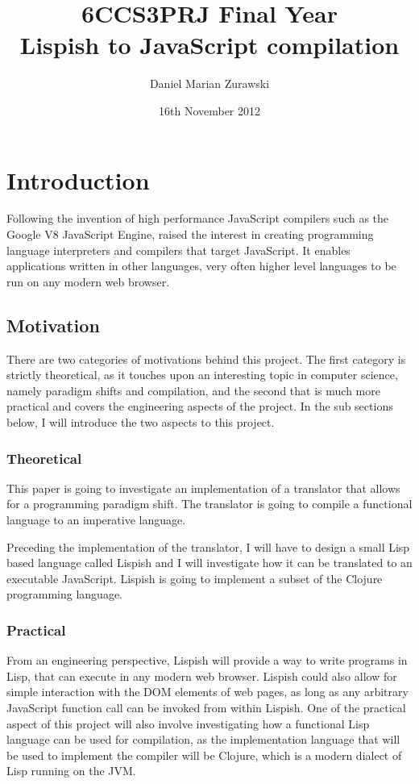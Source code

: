 \documentclass[11pt]{informatics-report}
\title{6CCS3PRJ Final Year\\\vspace{0.2cm}Lispish to JavaScript compilation}
\author{Daniel Marian Zurawski}
\date{16th November 2012}
\begin{document}
\createFrontMatter
\onehalfspacing
\tableofcontents
\doublespacing


\chapter{Introduction}
Following the invention of high performance JavaScript compilers such as the Google V8 JavaScript Engine, raised the interest in creating programming language interpreters and compilers that target JavaScript. It enables applications written in other languages, very often higher level languages to be run on any modern web browser. \\
 
 \section{Motivation}
There are two categories of motivations behind this project. The first category is strictly theoretical, as it touches upon an interesting topic in computer science, namely paradigm shifts and compilation, and the second that is much more practical and covers the engineering aspects of the project. In the sub sections below, I will introduce the two aspects to this project. 

\subsection{Theoretical}
This paper is going to investigate an implementation of a translator that allows for a programming paradigm shift. The translator is going to compile a functional language to an imperative language. 

Preceding the implementation of the translator, I will have to design a small Lisp based language called Lispish and I will investigate how it can be translated to an executable JavaScript. Lispish is going to implement a subset of the Clojure programming language.

\subsection{Practical}
From an engineering perspective, Lispish will provide a way to write programs in Lisp, that can execute in any modern web browser. Lispish could also allow for simple interaction with the DOM elements of web pages, as long as any arbitrary JavaScript function call can be invoked from within Lispish.
One of the practical aspect of this project will also involve investigating how a functional Lisp language can be used for compilation, as the implementation language that will be used to implement the compiler will be Clojure, which is a modern dialect of Lisp running on the JVM.  
\end{document}
